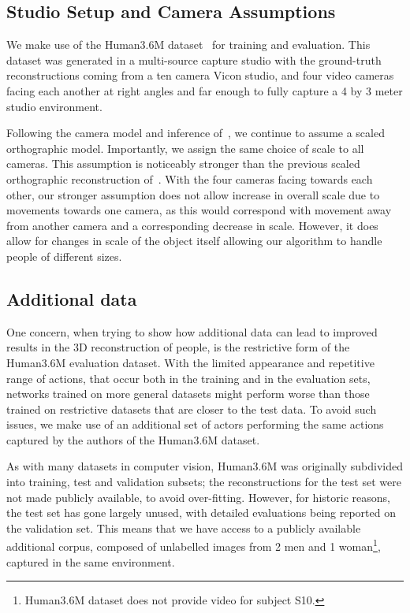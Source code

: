 \documentclass[10pt,twocolumn,letterpaper]{article}
\begin{document}
 \subsection{Studio Setup and Camera Assumptions}
\label{sec:studio-setup-camera}
  We make use of the Human3.6M dataset~\cite{ionescu2014human3} for
  training and evaluation.  This dataset was generated in a
  multi-source capture studio with the ground-truth reconstructions
  coming from a ten camera Vicon studio, and four video cameras facing
  each another at right angles and far enough to fully capture a 4 by
  3 meter studio environment.

 Following the camera model and inference of~\cite{tome2017lifting}, we continue
 to assume a scaled orthographic model. Importantly, we assign the same choice
 of scale to all cameras. This assumption is noticeably stronger than the
 previous scaled orthographic reconstruction of~\cite{tome2017lifting}.
With the four cameras facing
 towards each other, our stronger assumption does not allow increase in overall scale
 due to movements towards one camera, as this would correspond with movement away
 from another camera and a corresponding decrease in scale. However, it does
 allow for changes in scale of the object itself allowing our algorithm to
 handle people of different sizes.



 \subsection{Additional data}
 \label{sec:additional-data}
 One concern, when trying to show how additional data can lead to improved
 results in the 3D reconstruction of people, is the restrictive form of the
 Human3.6M evaluation dataset. With the limited appearance and repetitive
 range of actions, that occur both in the training and in the evaluation sets,
 networks trained on more general datasets might perform worse than those
 trained on restrictive datasets that are closer to the test data. To avoid such
 issues, we make use of an additional set of actors performing the same actions
 captured by the authors of the Human3.6M dataset.

As with many datasets  in computer vision,  Human3.6M was
originally subdivided into training, test and validation subsets; the
reconstructions for the test set were not made publicly available, to avoid
over-fitting. However, for historic reasons, the test set has gone largely
unused, with detailed evaluations being reported on the validation set. This
means that we have access to a publicly available additional corpus, composed of
unlabelled images from 2 men and 1 woman\footnote{Human3.6M dataset does not
  provide video for subject S10.}, captured in the same environment.
\end{document}
